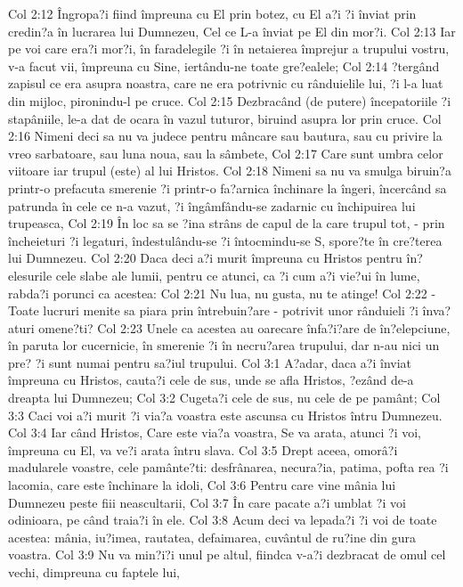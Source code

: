 Col 2:12  Îngropa?i fiind împreuna cu El prin botez, cu El a?i ?i înviat prin credin?a în lucrarea lui Dumnezeu, Cel ce L-a înviat pe El din mor?i.
Col 2:13  Iar pe voi care era?i mor?i, în faradelegile ?i în netaierea împrejur a trupului vostru, v-a facut vii, împreuna cu Sine, iertându-ne toate gre?ealele;
Col 2:14  ?tergând zapisul ce era asupra noastra, care ne era potrivnic cu rânduielile lui, ?i l-a luat din mijloc, pironindu-l pe cruce.
Col 2:15  Dezbracând (de putere) începatoriile ?i stapâniile, le-a dat de ocara în vazul tuturor, biruind asupra lor prin cruce.
Col 2:16  Nimeni deci sa nu va judece pentru mâncare sau bautura, sau cu privire la vreo sarbatoare, sau luna noua, sau la sâmbete,
Col 2:17  Care sunt umbra celor viitoare iar trupul (este) al lui Hristos.
Col 2:18  Nimeni sa nu va smulga biruin?a printr-o prefacuta smerenie ?i printr-o fa?arnica închinare la îngeri, încercând sa patrunda în cele ce n-a vazut, ?i îngâmfându-se zadarnic cu închipuirea lui trupeasca,
Col 2:19  În loc sa se ?ina strâns de capul de la care trupul tot, - prin încheieturi ?i legaturi, îndestulându-se ?i întocmindu-se S, spore?te în cre?terea lui Dumnezeu.
Col 2:20  Daca deci a?i murit împreuna cu Hristos pentru în?elesurile cele slabe ale lumii, pentru ce atunci, ca ?i cum a?i vie?ui în lume, rabda?i porunci ca acestea:
Col 2:21  Nu lua, nu gusta, nu te atinge!
Col 2:22  - Toate lucruri menite sa piara prin întrebuin?are - potrivit unor rânduieli ?i înva?aturi omene?ti?
Col 2:23  Unele ca acestea au oarecare înfa?i?are de în?elepciune, în paruta lor cucernicie, în smerenie ?i în necru?area trupului, dar n-au nici un pre? ?i sunt numai pentru sa?iul trupului.
Col 3:1  A?adar, daca a?i înviat împreuna cu Hristos, cauta?i cele de sus, unde se afla Hristos, ?ezând de-a dreapta lui Dumnezeu;
Col 3:2  Cugeta?i cele de sus, nu cele de pe pamânt;
Col 3:3  Caci voi a?i murit ?i via?a voastra este ascunsa cu Hristos întru Dumnezeu.
Col 3:4  Iar când Hristos, Care este via?a voastra, Se va arata, atunci ?i voi, împreuna cu El, va ve?i arata întru slava.
Col 3:5  Drept aceea, omorâ?i madularele voastre, cele pamânte?ti: desfrânarea, necura?ia, patima, pofta rea ?i lacomia, care este închinare la idoli,
Col 3:6  Pentru care vine mânia lui Dumnezeu peste fiii neascultarii,
Col 3:7  În care pacate a?i umblat ?i voi odinioara, pe când traia?i în ele.
Col 3:8  Acum deci va lepada?i ?i voi de toate acestea: mânia, iu?imea, rautatea, defaimarea, cuvântul de ru?ine din gura voastra.
Col 3:9  Nu va min?i?i unul pe altul, fiindca v-a?i dezbracat de omul cel vechi, dimpreuna cu faptele lui,
